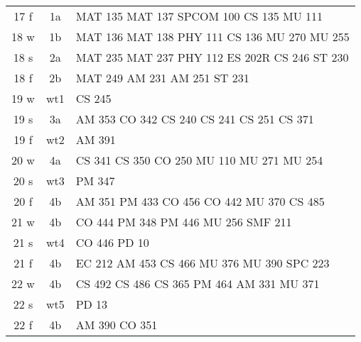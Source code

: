 \documentclass[convert]{standalone}
\newcommand{\opt}[1]{{\color{gray!50}#1}}
\newcommand{\opw}[1]{{\color{white}#1}}
\begin{document}
\begin{tabular}{|c | c | l |}
	\hline
	17 f & 1a & MAT 135 \quad MAT 137 \quad SPCOM 100 \quad CS 135 \quad MU 111 \\
	18 w & 1b & MAT 136 \quad MAT 138 \quad PHY 111 \quad CS 136 \quad MU 270 \quad MU 255\\
	18 s & 2a & MAT 235 \quad MAT 237 \quad PHY 112 \quad ES 202R \quad CS 246 \quad ST  230 \\
	18 f & 2b & MAT 249 \quad AM 231 \quad AM 251 \quad ST  231 \\
	19 w & wt1 & CS 245 \\
	19 s & 3a & AM 353 \quad CO 342 \quad CS 240 \quad CS 241 \quad CS 251 \quad CS 371 \\
	19 f & wt2 & AM 391 \\
	20 w & 4a & CS 341 \quad CS 350 \quad CO 250  \quad MU 110 \quad MU 271 \quad MU 254 \\
	20 s & wt3 & PM 347 \\
	20 f & 4b & AM 351  \quad PM 433  \quad CO 456 \quad CO 442  \quad MU 370 \quad CS 485 \\
	21 w & 4b & CO 444 \quad PM 348   \quad \opw{MU 371}   \quad PM 446 \quad MU 256 \quad SMF 211 \\
	21 s & wt4 & CO 446 \quad PD 10  \\
	21 f & 4b & EC 212  \quad AM 453 \quad CS 466 \quad MU 376 \quad MU 390 \quad SPC 223    \\
	22 w & 4b & CS 492 \quad CS 486 \quad CS 365 \quad PM 464 \quad AM 331  \quad MU 371    \\
	22 s & wt5 & PD 13 \\
	22 f & 4b &  \opt{AM 390} \quad CO 351   \\\hline

\end{tabular}
\end{document}
